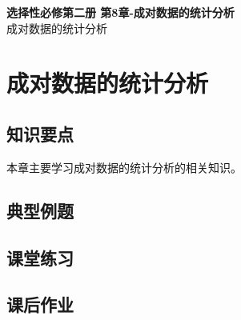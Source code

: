 \documentclass[12pt,a4paper]{article}
\begin{document}
\begin{center}
\LARGE\textbf{选择性必修第二册 第8章-成对数据的统计分析} \\[0.5em]
\large 成对数据的统计分析
\end{center}

\tableofcontents
\newpage

\section{成对数据的统计分析}

\subsection{知识要点}
本章主要学习成对数据的统计分析的相关知识。

\subsection{典型例题}

\subsection{课堂练习}

\subsection{课后作业}
\end{document}
